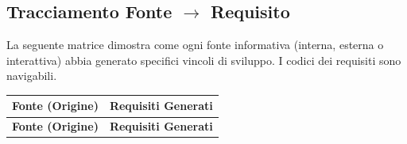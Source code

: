 \newpage
\subsection{Tracciamento Fonte $\rightarrow$ Requisito}
La seguente matrice dimostra come ogni fonte informativa (interna, esterna o interattiva) abbia generato specifici vincoli di sviluppo. I codici dei requisiti sono navigabili.

\renewcommand{\arraystretch}{1.15}
\begin{longtable}{|>{\raggedright}p{}|>{\raggedright\arraybackslash}p{}|}
    \hline
    \rowcolor[gray]{0.9}
    \textbf{Fonte (Origine)} & \textbf{Requisiti Generati} \\
    \hline
    \endfirsthead
    
    \hline
    \rowcolor[gray]{0.9}
    \textbf{Fonte (Origine)} & \textbf{Requisiti Generati} \\
    \hline
    \endhead


\end{longtable}
